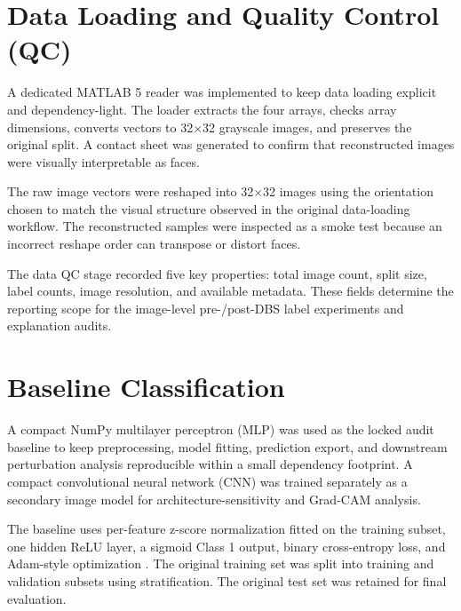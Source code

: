 \section{Data Loading and Quality Control (QC)}

A dedicated MATLAB 5 reader was implemented to keep data loading explicit and dependency-light. The loader extracts the four arrays, checks array dimensions, converts vectors to 32$\times$32 grayscale images, and preserves the original split. A contact sheet was generated to confirm that reconstructed images were visually interpretable as faces.


The raw image vectors were reshaped into 32$\times$32 images using the orientation chosen to match the visual structure observed in the original data-loading workflow. The reconstructed samples were inspected as a smoke test because an incorrect reshape order can transpose or distort faces.


The data QC stage recorded five key properties: total image count, split size, label counts, image resolution, and available metadata. These fields determine the reporting scope for the image-level pre-/post-DBS label experiments and explanation audits.


\section{Baseline Classification}

A compact NumPy multilayer perceptron (MLP) was used as the locked audit baseline to keep preprocessing, model fitting, prediction export, and downstream perturbation analysis reproducible within a small dependency footprint. A compact convolutional neural network (CNN) was trained separately as a secondary image model for architecture-sensitivity and Grad-CAM analysis.


The baseline uses per-feature z-score normalization fitted on the training subset, one hidden ReLU layer, a sigmoid Class 1 output, binary cross-entropy loss, and Adam-style optimization  . The original training set was split into training and validation subsets using stratification. The original test set was retained for final evaluation.


